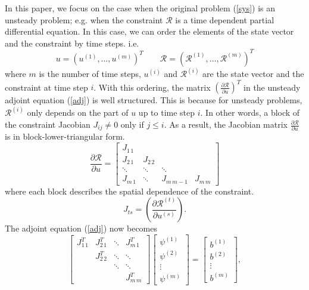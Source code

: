 \documentclass[a4paper,11pt]{article}
\theoremstyle{remark}
\theoremstyle{definition}
\begin{document}
    In this paper, we focus on the case when the original problem (\ref{sys}) is
    an unsteady problem; e.g. when the constraint $\mathcal{R}$ is a time
    dependent partial differential equation.  In this case, we can order the
    elements of the state vector and the constraint by time steps.
    i.e.
    \[ u = \left( u^{(1)}, \ldots, u^{(m)} \right)^T  \qquad
           \mathcal{R} = \left( \mathcal{R}^{(1)}, \ldots,
                                \mathcal{R}^{(m)} \right)^T
    \]
    where $m$ is the number of time steps, $u^{(i)}$ and $\mathcal{R}^{(i)}$ are
    the state vector and the constraint at time step $i$.  With this ordering,
    the matrix $\left( \frac{\partial\mathcal{R}}{\partial u} \right)^T$
    in the unsteady adjoint equation (\ref{adj}) is well structured.  This is
    because for unsteady problems, $\mathcal{R}^{(i)}$ only depends on the part
    of $u$ up to time step $i$.  In other words, a block of the constraint
    Jacobian $J_{i j} \ne 0$ only if $j\le i$.  As a result, the Jacobian matrix
    $\frac{\partial \mathcal{R}}{\partial u}$
    is in block-lower-triangular form.
    \begin{equation} \label{lower}
        \frac{\partial \mathcal{R}}{\partial u} =
        \begin{bmatrix}
            J_{1\,1} &          &            & \\
            J_{2\,1} & J_{2\,2} &            & \\
            \ddots   & \ddots   & \ddots     & \\
            J_{m\,1} & \ddots   & J_{m\,m-1} & J_{m\,m}
        \end{bmatrix}
    \end{equation}
    where each block describes the spatial dependence of the constraint.
    \[ J_{t s} =
        \left( \frac{\partial \mathcal{R}^{(t)}}{\partial u^{(s)}} \right).
    \]
    The adjoint equation (\ref{adj}) now becomes
    \begin{equation} \label{uadj}
        \begin{bmatrix}
        J_{1\,1}^T & J_{2\,1}^T & \ddots     & J_{m\,1}^T   \\
                   & J_{2\,2}^T & \ddots     & \ddots       \\
                   &            & \ddots     & \ddots       \\
                   &            &            & J_{m\,m}^T
        \end{bmatrix}
        \begin{bmatrix}
            \psi^{(1)} \\ \psi^{(2)} \\ \vdots \\ \psi^{(m)}
        \end{bmatrix}
        = \begin{bmatrix} b^{(1)} \\ b^{(2)} \\ \vdots \\ b^{(m)} \end{bmatrix},
    \end{equation}
\end{document}
